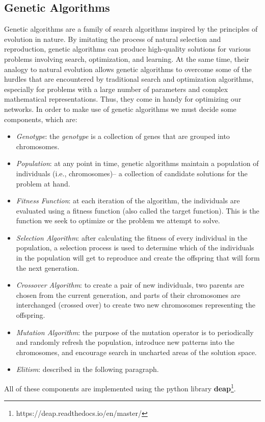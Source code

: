 \subsection{Genetic Algorithms}
Genetic algorithms are a family of search algorithms inspired by the principles of evolution in nature. By imitating the process of natural selection and reproduction, genetic algorithms can produce high-quality solutions for various problems involving search, optimization, and learning. At the same time, their analogy to natural evolution allows genetic algorithms to overcome some of the hurdles that are encountered by traditional search and optimization algorithms, especially for problems with a large number of parameters and complex mathematical representations. Thus, they come in handy for optimizing our networks.
In order to make use of genetic algorithms we must decide some components, which are:
\begin{itemize}
\item \textit{Genotype}: the \textit{genotype} is a collection of genes that are grouped into chromosomes. 
\item \textit{Population}: at any point in time, genetic algorithms maintain a population of individuals (i.e., chromosomes)– a collection of candidate solutions for the problem at hand.
\item \textit{Fitness Function}: at each iteration of the algorithm, the individuals are evaluated using a fitness function (also called the target function). This is the function we seek to optimize or the problem we attempt to solve.
\item \textit{Selection Algorithm}: after calculating the fitness of every individual in the population, a selection process is used to determine which of the individuals in the population will get to reproduce and create the offspring that will form the next generation.
\item \textit{Crossover Algorithm}: to create a pair of new individuals, two parents are chosen from the current generation, and parts of their chromosomes are interchanged (crossed over) to create two new chromosomes representing the offspring. 
\item \textit{Mutation Algorithm}: the purpose of the mutation operator is to periodically and randomly refresh the population, introduce new patterns into the chromosomes, and encourage search in uncharted areas of the solution space.
\item \textit{Elitism}: described in the following paragraph.
\end{itemize}
All of these components are implemented using the python library \textbf{deap}\footnote{https://deap.readthedocs.io/en/master/}.

